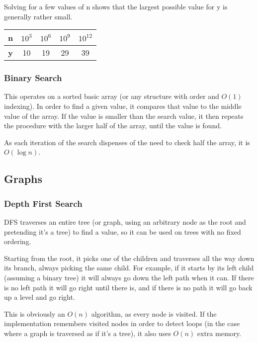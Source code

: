\documentclass[]{article}
\begin{document}
Solving for a few values of n shows that the largest possible value for y is generally rather small.

\begin{table}[h]
	\centering
\begin{tabular}{|c|c|c|c|c|}
	\hline \textbf {n} & $10^3$ & $10^6$ & $10^9$ & $10^{12}$ \\
	\hline \textbf{y} & 10 & 19 & 29 & 39 \\
	\hline 
\end{tabular}
\end{table}

\subsubsection{Binary Search}

This operates on a sorted basic array (or any structure with order and $O(1)$ indexing). In order to find a given value, it compares that value to the middle value of the array. If the value is smaller than the search value, it then repeats the procedure with the larger half of the array, until the value is found.

As each iteration of the search dispenses of the need to check half the array, it is $O(\log{n})$.

\pagebreak

\subsection{Graphs}

\subsubsection{Depth First Search}

DFS traverses an entire tree (or graph, using an arbitrary node as the root and pretending it's a tree) to find a value, so it can be used on trees with no fixed ordering.

Starting from the root, it picks one of the children and traverses all the way down its branch, always picking the same child. For example, if it starts by its left child (assuming a binary tree) it will always go down the left path when it can. If there is no left path it will go right until there is, and if there is no path it will go back up a level and go right.

This is obviously an $O(n)$ algorithm, as every node is visited. If the implementation remembers visited nodes in order to detect loops (in the case where a graph is traversed as if it's a tree), it also uses $O(n)$ extra memory.
\end{document}
